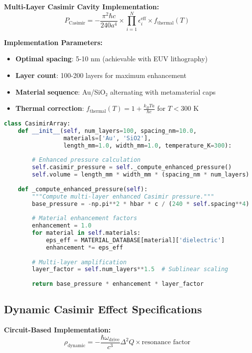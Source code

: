 \documentclass[11pt]{article}
\begin{document}
\textbf{Multi-Layer Casimir Cavity Implementation:}
\begin{equation}
P_{\text{Casimir}} = -\frac{\pi^2 \hbar c}{240 a^4} \times \prod_{i=1}^N \epsilon_i^{\text{eff}} \times f_{\text{thermal}}(T)
\end{equation}

\textbf{Implementation Parameters:}
\begin{itemize}
    \item \textbf{Optimal spacing}: 5-10 nm (achievable with EUV lithography)
    \item \textbf{Layer count}: 100-200 layers for maximum enhancement
    \item \textbf{Material sequence}: Au/SiO₂ alternating with metamaterial caps
    \item \textbf{Thermal correction}: $f_{\text{thermal}}(T) = 1 + \frac{k_B T a}{\hbar c}$ for $T < 300$ K
\end{itemize}

\begin{lstlisting}[language=Python]
class CasimirArray:
    def __init__(self, num_layers=100, spacing_nm=10.0, 
                 materials=['Au', 'SiO2'], 
                 length_mm=1.0, width_mm=1.0, temperature_K=300):
        
        # Enhanced pressure calculation
        self.casimir_pressure = self._compute_enhanced_pressure()
        self.volume = length_mm * width_mm * (spacing_nm * num_layers) * 1e-12
        
    def _compute_enhanced_pressure(self):
        """Compute multi-layer enhanced Casimir pressure."""
        base_pressure = -np.pi**2 * hbar * c / (240 * self.spacing**4)
        
        # Material enhancement factors
        enhancement = 1.0
        for material in self.materials:
            eps_eff = MATERIAL_DATABASE[material]['dielectric']
            enhancement *= eps_eff
        
        # Multi-layer amplification
        layer_factor = self.num_layers**1.5  # Sublinear scaling
        
        return base_pressure * enhancement * layer_factor
\end{lstlisting}

\subsection{Dynamic Casimir Effect Specifications}

\textbf{Circuit-Based Implementation:}
\begin{equation}
\rho_{\text{dynamic}} = -\frac{\hbar \omega_{\text{drive}}}{c^3} \Delta^2 Q \times \text{resonance factor}
\end{equation}
\end{document}
